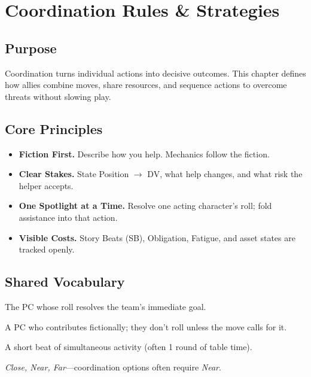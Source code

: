 \chapter{Coordination Rules \& Strategies}
\label{chap:coordination}

\section{Purpose}
\noindent Coordination turns individual actions into decisive outcomes. This chapter defines how allies combine moves, share resources, and sequence actions to overcome threats without slowing play.

\section{Core Principles}
\begin{itemize}
  \item \textbf{Fiction First.} Describe how you help. Mechanics follow the fiction.
  \item \textbf{Clear Stakes.} State Position $\to$ DV, what help changes, and what risk the helper accepts.
  \item \textbf{One Spotlight at a Time.} Resolve one acting character’s roll; fold assistance into that action.
  \item \textbf{Visible Costs.} Story Beats (SB), Obligation, Fatigue, and asset states are tracked openly.
\end{itemize}

\section{Shared Vocabulary}
\begin{description}[leftmargin=1.8em]
  \item[Acting Character] The PC whose roll resolves the team’s immediate goal.
  \item[Assistant] A PC who contributes fictionally; they don’t roll unless the move calls for it.
  \item[Exchange] A short beat of simultaneous activity (often 1 round of table time).
  \item[Range Bands] \emph{Close, Near, Far}—coordination options often require \emph{Near}.
\end{description}

